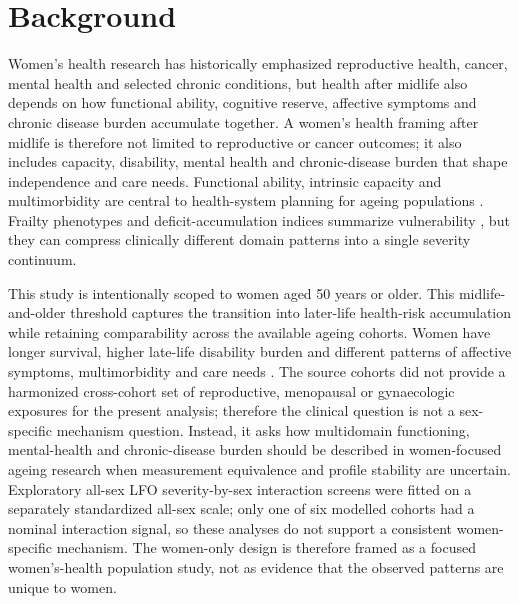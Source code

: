 \documentclass[pdflatex,sn-vancouver-num]{sn-jnl}
\begin{document}

\maketitle
\linenumbers
\doublespacing

\section{Background}\label{sec:background}

Women's health research has historically emphasized reproductive health, cancer, mental health and selected chronic conditions, but health after midlife also depends on how functional ability, cognitive reserve, affective symptoms and chronic disease burden accumulate together. A women's health framing after midlife is therefore not limited to reproductive or cancer outcomes; it also includes capacity, disability, mental health and chronic-disease burden that shape independence and care needs. Functional ability, intrinsic capacity and multimorbidity are central to health-system planning for ageing populations \cite{who2015worldreport,who2017icope,cesari2018evidence,barnett2012multimorbidity}. Frailty phenotypes and deficit-accumulation indices summarize vulnerability \cite{fried2001frailty,rockwood2007frailty,clegg2013frailty}, but they can compress clinically different domain patterns into a single severity continuum.

This study is intentionally scoped to women aged 50 years or older. This midlife-and-older threshold captures the transition into later-life health-risk accumulation while retaining comparability across the available ageing cohorts. Women have longer survival, higher late-life disability burden and different patterns of affective symptoms, multimorbidity and care needs \cite{crimmins2011gender}. The source cohorts did not provide a harmonized cross-cohort set of reproductive, menopausal or gynaecologic exposures for the present analysis; therefore the clinical question is not a sex-specific mechanism question. Instead, it asks how multidomain functioning, mental-health and chronic-disease burden should be described in women-focused ageing research when measurement equivalence and profile stability are uncertain. Exploratory all-sex LFO severity-by-sex interaction screens were fitted on a separately standardized all-sex scale; only one of six modelled cohorts had a nominal interaction signal, so these analyses do not support a consistent women-specific mechanism. The women-only design is therefore framed as a focused women's-health population study, not as evidence that the observed patterns are unique to women.
\end{document}
